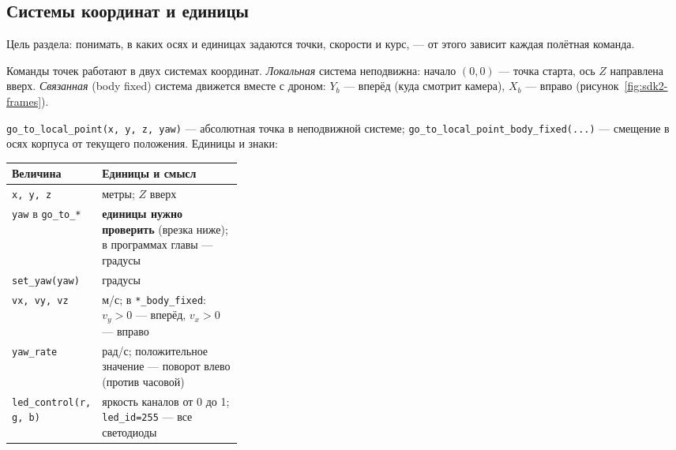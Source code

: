 \subsection{Системы координат и единицы}
\label{sec:sdk2-frames}

Цель раздела: понимать, в каких осях и единицах задаются точки, скорости и курс, --- от этого зависит каждая полётная команда.

Команды точек работают в двух системах координат. \emph{Локальная} система неподвижна: начало $(0,0)$ --- точка старта, ось $Z$ направлена вверх. \emph{Связанная} (body fixed) система движется вместе с дроном: $Y_b$ --- вперёд (куда смотрит камера), $X_b$ --- вправо (рисунок~\ref{fig:sdk2-frames}).



\verb|go_to_local_point(x, y, z, yaw)| --- абсолютная точка в неподвижной системе; \verb|go_to_local_point_body_fixed(...)| --- смещение в осях корпуса от текущего положения. Единицы и знаки:

\begin{center}
\small
\begin{tabularx}{\linewidth}{@{}>{\raggedright\arraybackslash}p{0.34\linewidth} X@{}}
\toprule
\textbf{Величина} & \textbf{Единицы и смысл} \\
\midrule
\verb|x, y, z| & метры; $Z$ вверх \\
\verb|yaw| в \verb|go_to_*| & \textbf{единицы нужно проверить} (врезка ниже); в программах главы --- градусы \\
\verb|set_yaw(yaw)| & градусы \\
\verb|vx, vy, vz| & м/с; в \verb|*_body_fixed|: $v_y > 0$ --- вперёд, $v_x > 0$ --- вправо \\
\verb|yaw_rate| & рад/с; положительное значение --- поворот влево (против часовой) \\
\verb|led_control(r, g, b)| & яркость каналов от 0 до 1; \verb|led_id=255| --- все светодиоды \\
\bottomrule
\end{tabularx}
\end{center}


